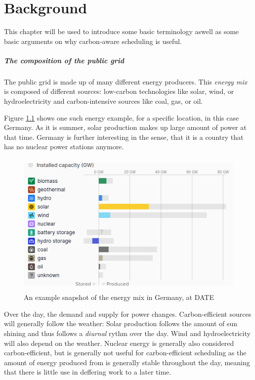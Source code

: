 \chapter{Background}

This chapter will be used to introduce some basic terminology aswell as some basic arguments on why carbon-aware scheduling is useful.

\paragraph{The composition of the public grid}
The public grid is made up of many different energy producers. This \emph{energy mix} is composed of different sources: low-carbon technologies like solar, wind, or hydroelectricity and carbon-intensive sources like coal, gas, or oil. 

Figure \ref{fig:energy_mix} shows one such energy example, for a specific location, in this case Germany.
As it is summer, solar production makes up large amount of power at that time. Germany is further interesting in the sense, that it is a country that has no nuclear power stations anymore.

\begin{figure}
    \includegraphics[width=\linewidth, height=200pt]{images/2_background2024-08-20-15-28-19.png}
    \caption[short]{An example snapshot of the energy mix in Germany, at DATE}
    \label{fig:energy_mix}
\end{figure}

Over the day, the demand and supply for power changes. Carbon-efficient sources will generally follow the weather: Solar production follows the amount of sun shining and thus follows a \emph{diurnal} rythm over the day. Wind and hydroelectricity will also depend on the weather. 
Nuclear energy is generally also considered carbon-efficient, but is generally not useful for carbon-efficient scheduling as the amount of energy produced from is generally stable throughout  the day, meaning that there is little use in deffering work to a later time. 

